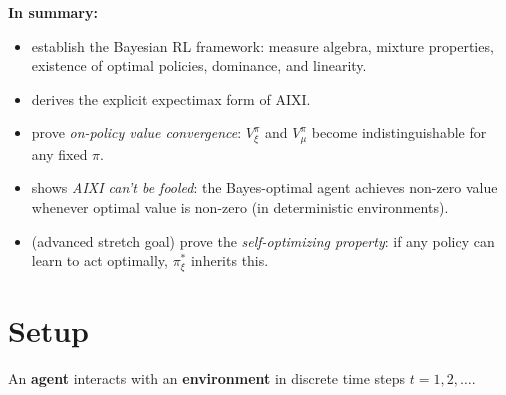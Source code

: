 \documentclass[fontsize=11pt, parskip=half]{scrartcl}
\theoremstyle{definition}
\begin{document}
\textbf{In summary:}
\begin{itemize}\itemsep=2pt
    \item {} establish the Bayesian RL framework: measure algebra, mixture properties, existence of optimal policies, dominance, and linearity.
    \item {} derives the explicit expectimax form of AIXI.
    \item {} prove \emph{on-policy value convergence}: $V_\xi^\pi$ and $V_\mu^\pi$ become indistinguishable for any fixed $\pi$.
    \item {} shows \emph{AIXI can't be fooled}: the Bayes-optimal agent achieves non-zero value whenever optimal value is non-zero (in deterministic environments).
    \item {} (advanced stretch goal) prove the \emph{self-optimizing property}: if any policy can learn to act optimally, $\pi_\xi^*$ inherits this.
\end{itemize}



\section*{Setup}

An \textbf{agent} interacts with an \textbf{environment} in discrete time steps $t = 1, 2, \ldots$.
\end{document}

